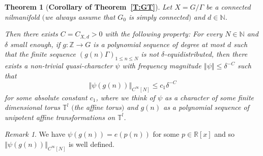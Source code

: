 \documentclass[11pt]{amsart}
\newcommand{\T}{\mathbb{T}}
\newcommand{\R}{\mathbb{R}}
\newcommand{\N}{\mathbb{N}}
\newcommand{\Z}{\mathbb{Z}}
\newcommand{\norm}[1]{\left\Vert #1\right\Vert}
\theoremstyle{plain}
\newtheorem{theorem}{Theorem}[section]
\theoremstyle{definition}
\theoremstyle{remark}
\newtheorem*{remark}{Remark}
\begin{document}
\begin{theorem}[{\bf Corollary of
    Theorem~\ref{T:GT}}]\label{T:GT2}
  Let $X=G/\Gamma$ be a connected nilmanifold $($we  always assume that $G_0$ is simply connected$)$ and $d\in\N$.

  Then there
  exists $C=C_{X,d}>0$ with the following property: For every $N\in\N$
  and $\delta$ small enough,
  if $g\colon \Z\to G$ is a polynomial sequence of degree at most $d$
  such that the finite sequence $(g(n)\Gamma)_{1\leq n\leq N}$ is not
  $\delta$-equidistributed, then there exists a non-trivial quasi-character $\psi$
  with frequency magnitude $\norm{\psi}\leq \delta^{-C}$ such that
  \begin{equation}\label{E:quasi}
    \norm{\psi(g(n))}_{C^\infty[N]}\leq  c_1 \delta^{-C}
  \end{equation}
  for some absolute constant $c_1$, where we think of $\psi$ as a
  character of some finite dimensional torus $\T^l$ $($the affine
  torus$)$ and $g(n)$ as a polynomial sequence of unipotent affine
  transformations on $\T^l$.
\end{theorem}
\begin{remark}
  We have $\psi(g(n))=e(p(n))$ for some $p\in \R[x]$ and so
  $\norm{\psi( g(n))}_{C^\infty[N]}$ is well defined.
\end{remark}
\end{document}
